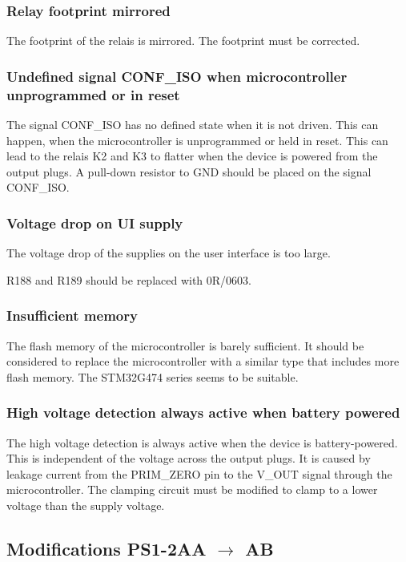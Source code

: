 \subsubsection{Relay footprint mirrored}
The footprint of the relais is mirrored. The footprint must be corrected. 

\subsubsection{Undefined signal CONF\_ISO when microcontroller unprogrammed or in reset}
The signal CONF\_ISO has no defined state when it is not driven. This can happen, when the microcontroller is unprogrammed or held in reset. This can lead to the relais K2 and K3 to flatter when the device is powered from the output plugs. 
A pull-down resistor to GND should be placed on the signal CONF\_ISO. 

\subsubsection{Voltage drop on UI supply}
The voltage drop of the supplies on the user interface is too large. 

R188 and R189 should be replaced with 0R/0603. 

\subsubsection{Insufficient memory}
The flash memory of the microcontroller is barely sufficient. It should be considered to replace the microcontroller with a similar type that includes more flash memory. The STM32G474 series seems to be suitable. 

\subsubsection{High voltage detection always active when battery powered}
The high voltage detection is always active when the device is battery-powered. This is independent of the voltage across the output plugs. It is caused by leakage current from the PRIM\_ZERO pin to the V\_OUT signal through the microcontroller. 
The clamping circuit must be modified to clamp to a lower voltage than the supply voltage. 

\subsection{Modifications PS1-2AA $\to$ AB}

